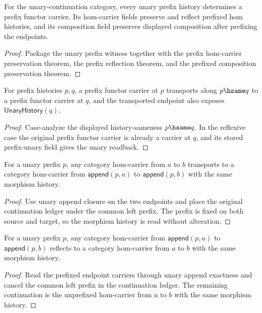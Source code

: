 
\begin{theorem}
\label{thm:prefix-functor-carrier-from-unary-prefix}
For the unary-continuation category, every unary prefix history determines a
prefix functor carrier. Its hom-carrier fields preserve and reflect prefixed
hom histories, and its composition field preserves displayed composition after
prefixing the endpoints.
\end{theorem}
\begin{proof}
Package the unary prefix witness together with the prefix hom-carrier
preservation theorem, the prefix reflection theorem, and the prefixed
composition preservation theorem.
\end{proof}

\begin{theorem}
\label{thm:prefix-functor-carrier-hsame-transport-with-unary}
For prefix histories $p,q$, a prefix functor carrier at $p$ transports along
$p\hsame q$ to a prefix functor carrier at $q$, and the transported endpoint
also exposes $\mathsf{UnaryHistory}(q)$.
\end{theorem}
\begin{proof}
Case-analyze the displayed history-sameness $p\hsame q$. In the reflexive
case the original prefix functor carrier is already a carrier at $q$, and its
stored prefix-unary field gives the unary readback.
\end{proof}

\begin{theorem}
\label{thm:functor-prefix-hom-carrier-preserves}
For a unary prefix $p$, any category hom-carrier from $a$ to $b$ transports to
a category hom-carrier from $\mathsf{append}(p,a)$ to
$\mathsf{append}(p,b)$ with the same morphism history.
\end{theorem}
\begin{proof}
Use unary append closure on the two endpoints and place the original
continuation ledger under the common left prefix. The prefix is fixed on both
source and target, so the morphism history is read without alteration.
\end{proof}

\begin{theorem}
\label{thm:functor-prefix-hom-carrier-reflects}
For a unary prefix $p$, any category hom-carrier from $\mathsf{append}(p,a)$ to
$\mathsf{append}(p,b)$ reflects to a category hom-carrier from $a$ to $b$ with
the same morphism history.
\end{theorem}
\begin{proof}
Read the prefixed endpoint carriers through unary append exactness and cancel
the common left prefix in the continuation ledger. The remaining continuation
is the unprefixed hom-carrier from $a$ to $b$ with the same morphism history.
\end{proof}

